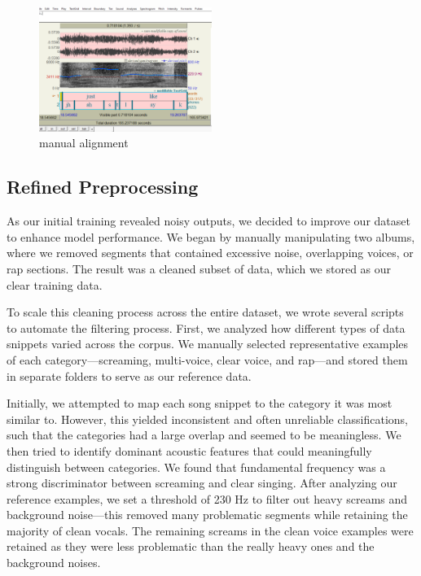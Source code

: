 \documentclass[a4paper]{article}
\begin{document}
\begin{figure}[htbp]
    \centering
    \includegraphics[width=0.5\textwidth]{graphics/manual_alignment.png}
    \caption{manual alignment}
    \label{fig:bild3}
\end{figure}

\subsection*{Refined Preprocessing}
As our initial training revealed noisy outputs, we decided to improve our dataset to enhance model performance. We began by manually manipulating two albums, where we removed segments that contained excessive noise, overlapping voices, or rap sections. The result was a cleaned subset of data, which we stored as our clear training data.

To scale this cleaning process across the entire dataset, we wrote several scripts to automate the filtering process. First, we analyzed how different types of data snippets varied across the corpus. We manually selected representative examples of each category—screaming, multi-voice, clear voice, and rap—and stored them in separate folders to serve as our reference data.

Initially, we attempted to map each song snippet to the category it was most similar to. However, this yielded inconsistent and often unreliable classifications, such that the categories had a large overlap and seemed to be meaningless. We then tried to identify dominant acoustic features that could meaningfully distinguish between categories. We found that fundamental frequency was a strong discriminator between screaming and clear singing. After analyzing our reference examples, we set a threshold of 230 Hz to filter out heavy screams and background noise—this removed many problematic segments while retaining the majority of clean vocals. The remaining screams in the clean voice examples were retained as they were less problematic than the really heavy ones and the background noises.
\end{document}

